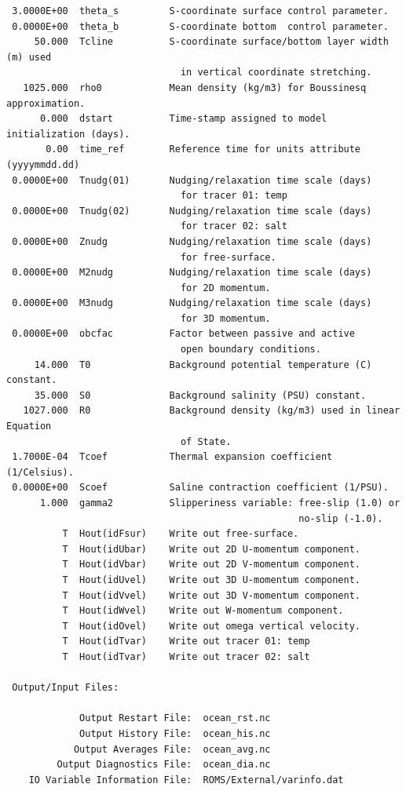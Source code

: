 \begin{verbatim}
 3.0000E+00  theta_s         S-coordinate surface control parameter.
 0.0000E+00  theta_b         S-coordinate bottom  control parameter.
     50.000  Tcline          S-coordinate surface/bottom layer width (m) used
                               in vertical coordinate stretching.
   1025.000  rho0            Mean density (kg/m3) for Boussinesq approximation.
      0.000  dstart          Time-stamp assigned to model initialization (days).
       0.00  time_ref        Reference time for units attribute (yyyymmdd.dd)
 0.0000E+00  Tnudg(01)       Nudging/relaxation time scale (days)
                               for tracer 01: temp
 0.0000E+00  Tnudg(02)       Nudging/relaxation time scale (days)
                               for tracer 02: salt
 0.0000E+00  Znudg           Nudging/relaxation time scale (days)
                               for free-surface.
 0.0000E+00  M2nudg          Nudging/relaxation time scale (days)
                               for 2D momentum.
 0.0000E+00  M3nudg          Nudging/relaxation time scale (days)
                               for 3D momentum.
 0.0000E+00  obcfac          Factor between passive and active
                               open boundary conditions.
     14.000  T0              Background potential temperature (C) constant.
     35.000  S0              Background salinity (PSU) constant.
   1027.000  R0              Background density (kg/m3) used in linear Equation
                               of State.
 1.7000E-04  Tcoef           Thermal expansion coefficient (1/Celsius).
 0.0000E+00  Scoef           Saline contraction coefficient (1/PSU).
      1.000  gamma2          Slipperiness variable: free-slip (1.0) or 
                                                    no-slip (-1.0).
          T  Hout(idFsur)    Write out free-surface.
          T  Hout(idUbar)    Write out 2D U-momentum component.
          T  Hout(idVbar)    Write out 2D V-momentum component.
          T  Hout(idUvel)    Write out 3D U-momentum component.
          T  Hout(idVvel)    Write out 3D V-momentum component.
          T  Hout(idWvel)    Write out W-momentum component.
          T  Hout(idOvel)    Write out omega vertical velocity.
          T  Hout(idTvar)    Write out tracer 01: temp
          T  Hout(idTvar)    Write out tracer 02: salt

 Output/Input Files:

             Output Restart File:  ocean_rst.nc
             Output History File:  ocean_his.nc
            Output Averages File:  ocean_avg.nc
         Output Diagnostics File:  ocean_dia.nc
    IO Variable Information File:  ROMS/External/varinfo.dat


\end{verbatim}
